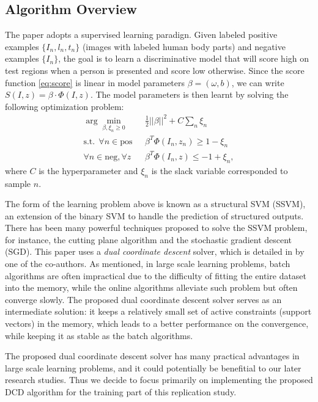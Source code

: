 \documentclass[10pt,twocolumn,letterpaper]{article}
\begin{document}
\subsection{Algorithm Overview}
\label{sec:learning_ov}
The paper adopts a supervised learning paradign. Given labeled positive examples $\{I_n,l_n,t_n\}$ (images with labeled human body parts) and negative examples $\{I_n\}$, the goal is to learn a discriminative model that will score high on test regions when a person is presented and score low otherwise. Since the score function \ref{eq:score} is linear in model parameters $\beta=(\omega,b)$, we can write $S(I,z)=\beta\cdot\Phi(I,z)$. The model parameters is then learnt by solving the following optimization problem:
\begin{equation}
  \begin{split}
    \arg\min_{\beta,\xi_n\geq0}                      ~~~& \frac{1}{2}||\beta||^2+C\sum_n{\xi_n} \\
    \text{s.t.}~~ \forall n\in \text{pos}            ~~~& \beta^{T}\Phi(I_n,z_n) \geq 1-\xi_n \\
                  \forall n\in \text{neg}, \forall z ~~~& \beta^{T}\Phi(I_n,z) \leq -1+\xi_n,
  \end{split}
\label{eq:ssvm}
\end{equation}
where $C$ is the hyperparameter and $\xi_n$ is the slack variable corresponded to sample $n$.

The form of the learning problem above is known as a structural SVM (SSVM), an extension of the binary SVM to handle the prediction of structured outputs. There has been many powerful techniques proposed to solve the SSVM problem, for instance, the cutting plane algorithm and the stochastic gradient descent (SGD). This paper uses a {\it dual coordinate descent } solver, which is detailed in \cite{Ramanan_TR2012} by one of the co-authors. As \cite{Ramanan_TR2012} mentioned, in large scale learning problems, batch algorithms are often impractical due to the difficulty of fitting the entire dataset into the memory, while the online algorithms alleviate such problem but often converge slowly. The proposed dual coordinate descent solver serves as an intermediate solution: it keeps a relatively small set of active constraints (support vectors) in the memory, which leads to a better performance on the convergence, while keeping it as stable as the batch algorithms.

The proposed dual coordinate descent solver has many practical advantages in large scale learning problems, and it could potentially be benefitial to our later research studies. Thus we decide to focus primarily on implementing the proposed DCD algorithm for the training part of this replication study. 
\end{document}
